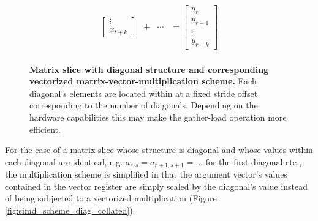 \documentclass{article}
\begin{document}
\begin{figure}[ht]
$$\begin{matrix}
\begin{bmatrix}
                                                                                \vdots \\
                                                                                x_{t+k}
                                                                              \end{bmatrix} & + & \cdots & = \begin{bmatrix}
                                                                                                                 y_{r} \\
                                                                                                                 y_{r+1} \\
                                                                                                                 \vdots \\
                                                                                                                 y_{r+k}
                                                                                                                \end{bmatrix}\\

        \end{matrix}
        $$
        \caption[Matrix slice with diagonal structure and corresponding vectorized matrix-vector-multiplication scheme.]{\textbf{Matrix slice with diagonal structure and corresponding vectorized matrix-vector-multiplication scheme.} Each diagonal's elements are located within \V at a fixed stride offset corresponding to the number of diagonals. Depending on the hardware capabilities this may make the gather-load operation more efficient.}
        \label{fig:simd_scheme_diag}
      \end{figure}

      For the case of a matrix slice whose structure is diagonal and whose values within each diagonal are identical, e.g. $a_{r,s} = a_{r+1, s+1} = \ldots$ for the first diagonal etc., the multiplication scheme is simplified in that the argument vector's values contained in the vector register are simply scaled by the diagonal's value instead of being subjected to a vectorized multiplication (Figure \ref{fig:simd_scheme_diag_collated}).
\end{document}
